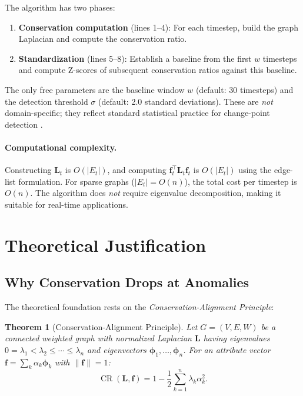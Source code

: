 \documentclass[11pt,a4paper]{article}
\newtheorem{theorem}{Theorem}[section]
\newcommand{\bff}{\mathbf{f}}
\newcommand{\bL}{\mathbf{L}}
\newcommand{\bphi}{\boldsymbol{\phi}}
\DeclareMathOperator{\CR}{CR}
\begin{document}
The algorithm has two phases:
\begin{enumerate}
  \item \textbf{Conservation computation} (lines 1--4): For each timestep,
        build the graph Laplacian and compute the conservation ratio.
  \item \textbf{Standardization} (lines 5--8): Establish a baseline from the
        first $w$ timesteps and compute Z-scores of subsequent conservation
        ratios against this baseline.
\end{enumerate}

The only free parameters are the baseline window $w$ (default: 30 timesteps)
and the detection threshold $\sigma$ (default: 2.0 standard deviations).  These
are \emph{not} domain-specific; they reflect standard statistical practice for
change-point detection \citep{basseville1993detection}.

\paragraph{Computational complexity.}
Constructing $\bL_t$ is $O(|E_t|)$, and computing $\bff_t^\top \bL_t \bff_t$
is $O(|E_t|)$ using the edge-list formulation.  For sparse graphs ($|E_t| = O(n)$),
the total cost per timestep is $O(n)$.  The algorithm does \emph{not} require
eigenvalue decomposition, making it suitable for real-time applications.

\section{Theoretical Justification}\label{sec:theory}

\subsection{Why Conservation Drops at Anomalies}

The theoretical foundation rests on the \emph{Conservation-Alignment Principle}:

\begin{theorem}[Conservation-Alignment Principle]\label{thm:cap}
Let $G = (V, E, W)$ be a connected weighted graph with normalized Laplacian
$\bL$ having eigenvalues $0 = \lambda_1 < \lambda_2 \leq \cdots \leq \lambda_n$
and eigenvectors $\bphi_1, \ldots, \bphi_n$.  For an attribute vector
$\bff = \sum_k \alpha_k \bphi_k$ with $\|\bff\| = 1$:
\begin{equation}\label{eq:cr-spectral}
  \CR(\bL, \bff) = 1 - \frac{1}{2}\sum_{k=1}^{n} \lambda_k \alpha_k^2.
\end{equation}
\end{theorem}
\end{document}

